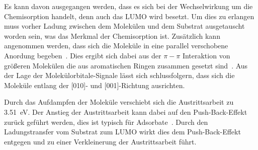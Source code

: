         Es kann davon ausgegangen werden, dass es sich bei der Wechselwirkung um die Chemisorption handelt, denn auch das LUMO wird besetzt.
        Um dies zu erlangen muss vorher Ladung zwischen dem Molekülen und dem Substrat ausgetauscht worden sein, was das Merkmal der Chemisorption ist.
        Zusätzlich kann angenommen werden, dass sich die Moleküle in eine parallel verschobene Anordung begeben~\cite{IF_13}.
        Dies ergibt sich dabei aus der $\pi-\pi$ Interaktion von größeren Molekülen die aus aromatischen Ringen zusammen gesetzt sind~\cite{IF_13}.
        Aus der Lage der Molekülorbitale-Signale lässt sich schlussfolgern, dass sich die Moleküle entlang der [010]- und [001]-Richtung ausrichten.

        Durch das Aufdampfen der Moleküle verschiebt sich die Austrittsarbeit zu \SI{3.51}{\electronvolt}.
        Der Anstieg der Austrittsarbeit kann dabei auf den Push-Back-Effekt zurück geführt werden, dies ist typisch für Adsorbate~\cite{Goiri}.
        Durch den Ladungstransfer vom Substrat zum LUMO wirkt dies dem Push-Back-Effekt entgegen und zu einer Verkleinerung der Austrittsarbeit führt.


        

